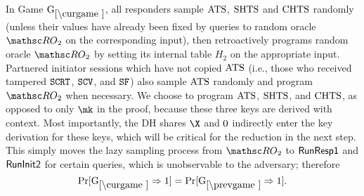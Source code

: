 \begin{collectinmacro}{\TLSProofFull}{}{}


In Game $\curGm$, all responders sample $\mathrm{ATS}$, $\mathrm{SHTS}$ and $\mathrm{CHTS}$ randomly (unless their values have already been fixed by queries to random oracle $\RO_2$ on the corresponding input), then retroactively programs random oracle $\RO_2$ by setting its internal table $H_2$ on the appropriate input.
Partnered initiator sessions which have not copied $\mathrm{ATS}$ (i.e., those who received tampered $\mathtt{SCRT}$, $\mathtt{SCV}$, and $\mathtt{SF}$) also sample $\mathrm{ATS}$ randomly and program $\RO_2$ when necessary.
We choose to program $\mathrm{ATS}$, $\mathrm{SHTS}$, and $\mathrm{CHTS}$, as opposed to only $\mk$ in the \SIGMAI proof, because these three keys are derived with context. 
Most importantly, the DH shares $\X$ and $\Y$ indirectly enter the key derivation for these keys, which will be critical for the reduction in the next step.
This simply moves the lazy sampling process from $\RO_2$ to $\mathsf{RunResp1}$ and $\mathsf{RunInit2}$ for certain queries, which is unobservable to the adversary; therefore
\[ \Pr[\curGm* \Rightarrow 1] = \Pr[\prevGm* \Rightarrow 1]. \]


\end{collectinmacro}
